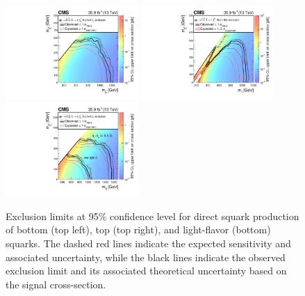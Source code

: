 \begin{figure}
	\centering
	\includegraphics[width=0.45\textwidth]{results/figs/interpretations/T2bb_35p9ifb_Moriond2017_Mar07_XSEC}
	\includegraphics[width=0.45\textwidth]{results/figs/interpretations/T2tt_35p9ifb_Moriond2017_Mar07_XSEC}
	\includegraphics[width=0.45\textwidth]{results/figs/interpretations/T2qq_35p9ifb_Moriond2017_Mar07_XSEC}
	\caption{Exclusion limits at 95\% confidence level for direct squark production of bottom (top left), top (top right), and light-flavor (bottom) squarks. The dashed red lines indicate the expected sensitivity and associated uncertainty, while the black lines indicate the observed exclusion limit and its associated theoretical uncertainty based on the signal cross-section.}
	\label{fig:limitsSquark}
\end{figure}
